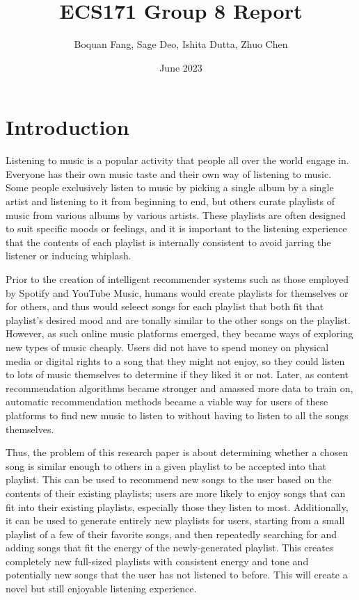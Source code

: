\documentclass{article}
\title{ECS171 Group 8 Report}
\author{Boquan Fang, Sage Deo, Ishita Dutta, Zhuo Chen}
\date{June 2023}
\begin{document}
\section{Introduction}
Listening to music is a popular activity that people all over the world engage in. 
Everyone has their own music taste and their own way of listening to music.
Some people exclusively listen to music by picking a single album by a single artist 
and listening to it from beginning to end, but others curate playlists of music from
various albums by various artists. These playlists are often designed to suit specific
moods or feelings, and it is important to the listening experience that the contents of
each playlist is internally consistent to avoid jarring the listener or inducing whiplash.

Prior to the creation of intelligent recommender systems such as those employed by 
Spotify and YouTube Music, humans would create playlists for themselves or for others,
and thus would seleect songs for each playlist that both fit that playlist's desired mood
and are tonally similar to the other songs on the playlist. However, as such 
online music platforms emerged, they became ways of exploring new types of music cheaply.
Users did not have to spend money on physical media or digital rights to a song that they
might not enjoy, so they could listen to lots of music themselves to determine if they liked it
or not. Later, as content recommendation algorithms became stronger and amassed more data
to train on, automatic recommendation methods became a viable way for users of these platforms
to find new music to listen to without having to listen to all the songs themselves. 

Thus, the problem of this research paper is about determining whether a chosen song is similar enough
to others in a given playlist to be accepted into that playlist. This can be used to recommend
new songs to the user based on the contents of their existing playlists; users are more likely
to enjoy songs that can fit into their existing playlists, especially those they listen to most.
Additionally, it can be used to generate entirely new playlists for users, starting from a small
playlist of a few of their favorite songs, and then repeatedly searching for and adding songs that
fit the energy of the newly-generated playlist. This creates completely new full-sized playlists 
with consistent energy and tone and potentially new songs that the user has not listened to before.
This will create a novel but still enjoyable listening experience. 
\end{document}
